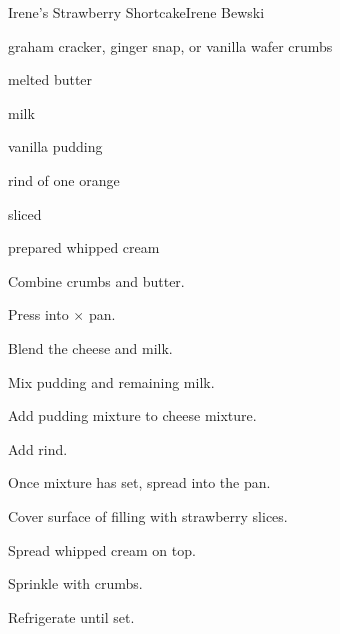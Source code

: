 \begin{recipe}{Irene's Strawberry Shortcake}{Irene Bewski}{}

\begin{ingredients}
\item \C{2\half} graham cracker, ginger snap, or vanilla wafer crumbs
\item \C{\half} melted butter
\item {} 
\item \C{1\threequarter} milk
\item \oz{3\quarter} vanilla pudding
\item rind of one orange
\item {} sliced 
\item prepared whipped cream
\end{ingredients}

\begin{directions}
\item Combine crumbs and butter.
\item Press into $\times$ pan.
\item Blend the cheese and \C{\half} milk.
\item Mix pudding and remaining milk.
\item Add pudding mixture to cheese mixture.
\item Add rind.
\item Once mixture has set, spread into the pan.
\item Cover surface of filling with strawberry slices.
\item Spread whipped cream on top.
\item Sprinkle with crumbs.
\item Refrigerate until set.
\end{directions}

\end{recipe}
